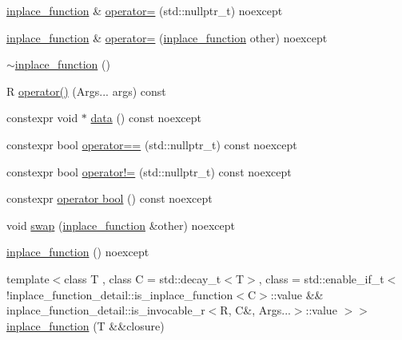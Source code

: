 \begin{DoxyCompactItemize}
\item 
\hyperlink{classstdext_1_1inplace__function}{inplace\+\_\+function} \& \hyperlink{classstdext_1_1inplace__function_3_01R_07Args_8_8_8_08_00_01Capacity_00_01Alignment_01_4_af53e5cf03650c43b743bd040674d4762}{operator=} (std\+::nullptr\+\_\+t) noexcept
\item 
\hyperlink{classstdext_1_1inplace__function}{inplace\+\_\+function} \& \hyperlink{classstdext_1_1inplace__function_3_01R_07Args_8_8_8_08_00_01Capacity_00_01Alignment_01_4_a191f41fe8250b4189176a9baae25ee60}{operator=} (\hyperlink{classstdext_1_1inplace__function}{inplace\+\_\+function} other) noexcept
\item 
\hyperlink{classstdext_1_1inplace__function_3_01R_07Args_8_8_8_08_00_01Capacity_00_01Alignment_01_4_acb623711bd68bbbf71cb7e233f6226de}{$\sim$inplace\+\_\+function} ()
\item 
R \hyperlink{classstdext_1_1inplace__function_3_01R_07Args_8_8_8_08_00_01Capacity_00_01Alignment_01_4_a64e0f59000063faaf35ebdcdf1e10bae}{operator()} (Args... args) const
\item 
constexpr void $\ast$ \hyperlink{classstdext_1_1inplace__function_3_01R_07Args_8_8_8_08_00_01Capacity_00_01Alignment_01_4_a2fc2327b65754cc6c20d37d76cb86aa9}{data} () const noexcept
\item 
constexpr bool \hyperlink{classstdext_1_1inplace__function_3_01R_07Args_8_8_8_08_00_01Capacity_00_01Alignment_01_4_a174b90228b202356b44b3fa91ae566e0}{operator==} (std\+::nullptr\+\_\+t) const noexcept
\item 
constexpr bool \hyperlink{classstdext_1_1inplace__function_3_01R_07Args_8_8_8_08_00_01Capacity_00_01Alignment_01_4_a0991678f0a58072f1f3f89919fe92676}{operator!=} (std\+::nullptr\+\_\+t) const noexcept
\item 
constexpr \hyperlink{classstdext_1_1inplace__function_3_01R_07Args_8_8_8_08_00_01Capacity_00_01Alignment_01_4_a8fa4d88e328279b050356c0968ec0498}{operator bool} () const noexcept
\item 
void \hyperlink{classstdext_1_1inplace__function_3_01R_07Args_8_8_8_08_00_01Capacity_00_01Alignment_01_4_a7524f21e7df2da0b701d6948c0936956}{swap} (\hyperlink{classstdext_1_1inplace__function}{inplace\+\_\+function} \&other) noexcept
\item 
\hyperlink{classstdext_1_1inplace__function_3_01R_07Args_8_8_8_08_00_01Capacity_00_01Alignment_01_4_abf61c53037695ba21179552164a87102}{inplace\+\_\+function} () noexcept
\item 
{\footnotesize template$<$class T , class C  = std\+::decay\+\_\+t$<$\+T$>$, class  = std\+::enable\+\_\+if\+\_\+t$<$            !inplace\+\_\+function\+\_\+detail\+::is\+\_\+inplace\+\_\+function$<$\+C$>$\+::value            \&\& inplace\+\_\+function\+\_\+detail\+::is\+\_\+invocable\+\_\+r$<$\+R, C\&, Args...$>$\+::value        $>$$>$ }\\\hyperlink{classstdext_1_1inplace__function_3_01R_07Args_8_8_8_08_00_01Capacity_00_01Alignment_01_4_a28bb1c55b24a4056b128be868af7794b}{inplace\+\_\+function} (T \&\&closure)

\end{DoxyCompactItemize}
